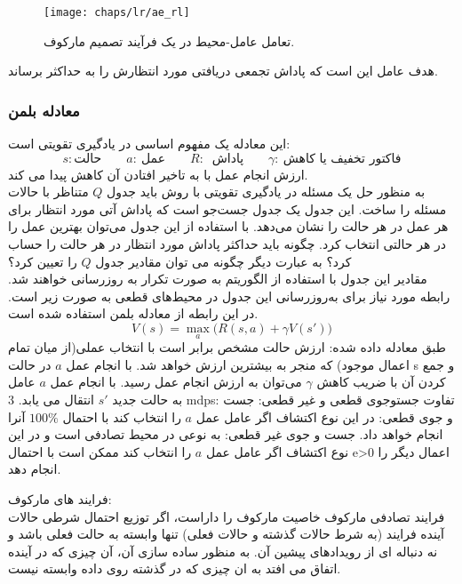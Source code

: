   \begin{figure}[!ht]
 	\centerline{\texttt{[image: chaps/lr/ae\_rl]}}
 	\caption{
 		تعامل عامل-محیط
 		در یک فرآیند تصمیم مارکوف.
 	}
 	\label{fig:ch_lr:ae_rl}
 \end{figure}
 هدف عامل این است که پاداش تجمعی دریافتی مورد انتظارش را به حداکثر برساند.
 \subsubsection{ معادله بلمن}
 این معادله یک مفهوم اساسی در یادگیری تقویتی است:
 $$ s: \text{حالت}\qquad a:\ \text{عمل}\qquad R:\ \text{ پاداش}\qquad  \gamma:\ \text{فاکتور تخفیف یا کاهش}$$
ارزش انجام عمل با به تاخیر افتادن آن کاهش پیدا می کند.
 \\
 به منظور حل یک مسئله در یادگیری تقویتی با روش  باید جدول $Q$ متناظر با حالات مسئله را  ساخت. این جدول یک جدول جست‌جو است که پاداش آتی مورد انتظار برای هر عمل در هر حالت را نشان می‌دهد. با استفاده از این جدول می‌توان بهترین عمل را در هر حالتی انتخاب کرد.
 چگونه باید حداکثر پاداش مورد انتظار در هر حالت را حساب کرد؟ به عبارت دیگر چگونه می توان مقادیر جدول $Q$ را تعیین کرد؟
 \\
  مقادیر این جدول با استفاده از الگوریتم  به صورت تکرار به روزرسانی خواهند شد. رابطه مورد نیاز برای به‌روزرسانی این جدول در محیط‌های قطعی به صورت زیر است. در این رابطه از معادله بلمن استفاده شده است.
 \begin{equation}
 	V(s) = \max_{a}\big(R(s,a)+\gamma V(s')\big)
 \end{equation}
 طبق معادله داده شده:
 ارزش حالت مشخص برابر است با انتخاب عملی(از میان تمام  اعمال موجود) که منجر به بیشترین ارزش خواهد شد. 
 با انجام عمل $a$ در حالت s و جمع کردن آن با ضریب کاهش $\gamma$ می‌توان به ارزش انجام عمل رسید. 
 با انجام عمل $a$ عامل به حالت جدید $s'$ انتقال می یابد. 
 3 \glspl{mdp}:
 تفاوت جستوجوی قطعی و غیر قطعی:
 جست و جوی قطعی: در این نوع اکتشاف اگر عامل عمل $a$ را انتخاب کند با احتمال $100\%$  آنرا انجام خواهد داد.
 جست و جوی غیر قطعی: به نوعی در محیط تصادفی است و در این نوع اکتشاف اگر عامل عمل $a$ را انتخاب کند ممکن است با احتمال e>0 اعمال دیگر را انجام دهد. 
 
 فرایند های مارکوف:
\\
 فرایند تصادفی مارکوف خاصیت مارکوف را داراست، اگر توزیع احتمال شرطی حالات آینده فرایند (به شرط حالات گذشته و حالات فعلی) تنها وابسته به حالت فعلی باشد و نه دنباله ای از رویدادهای پیشین آن. به منظور ساده سازی آن، آن چیزی که در آینده اتفاق می افتد به ان چیزی که در گذشته روی داده وابسته نیست. 
 
